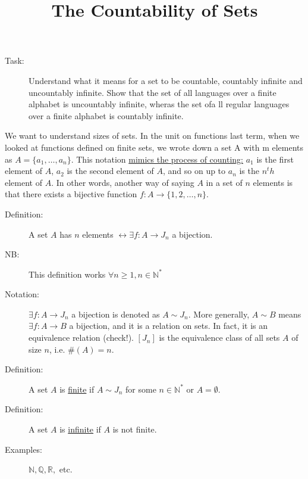 \documentclass{article}
\begin{document}
	\title{The Countability of Sets}
	\author{}	%
	\date{}
	\maketitle

	\label{Lecture 46}

	\begin{description}
		\item[Task:] Understand what it means for a set to be countable, countably infinite and uncountably infinite. Show that the set of all languages over a finite alphabet is uncountably infinite, wheras the set ofa ll regular languages over a finite alphabet is countably infinite.
	\end{description}

	We want to understand sizes of sets.
	In the unit on functions last term, when we looked at functions defined on finite sets, we wrote down a set A with m elements as $A = \{a_1, \dots, a_n\}$.
	This notation \underline{mimics the process of counting:} $a_1$ is the first element of $A$, $a_2$ is the second element of $A$, and so on up to $a_n$ is the $n^th$ element of $A$.
	In other words, another way of saying $A$ in a set of $n$ elements is that there exists a bijective function $f: A \rightarrow \{1, 2, \dots, n\}$.

	\begin{description}
		\item[Definition:] A set $A$ has $n$ elements $\leftrightarrow \exists f: A \rightarrow J_n$ a bijection.
		\item[NB:] This definition works $\forall n \geq 1, n \in \mathbb{N}^\ast$
		\item[Notation:] $\exists f: A \rightarrow J_n$ a bijection is denoted as $A \sim J_n$.
			More generally, $A \sim B$ means $\exists f: A \rightarrow B$ a bijection, and it is a relation on sets.
			In fact, it is an equivalence relation (check!). $[J_n]$ is the equivalence class of all sets $A$ of size $n$, i.e. $\#(A) = n$.
	\end{description}

	\begin{description}
		\item[Definition:] A set $A$ is \underline{finite} if $A \sim J_n$ for some $n \in \mathbb{N}^\ast$ or $A = \emptyset$.
		\item[Definition:] A set $A$ is \underline{infinite} if $A$ is not finite.
		\item[Examples:] $\mathbb{N, Q, R,}$ etc.
	\end{description}
\end{document}
